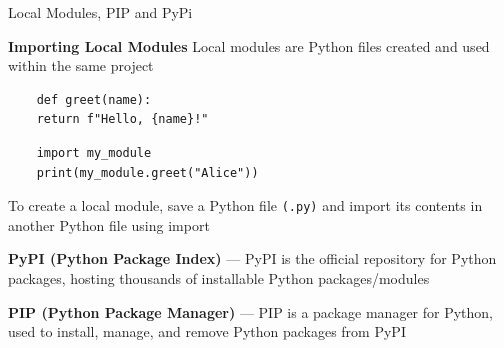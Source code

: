\documentclass[
	11pt, 
]{beamer}
\begin{document}


\begin{frame}[fragile]{Local Modules, PIP and PyPi}

\begin{block}{\textbf{Importing Local Modules}}
Local modules are Python files created and used within the same project

\begin{verbatim}
    def greet(name):
    return f"Hello, {name}!"
\end{verbatim}

\begin{verbatim}
    import my_module
    print(my_module.greet("Alice"))
\end{verbatim}

To create a local module, save a Python file \texttt{(.py)} and import its contents in another Python file using import
\end{block}

\vspace{.2cm}

\textbf{PyPI (Python Package Index)} --- PyPI is the official repository for Python packages, hosting thousands of installable Python packages/modules

\vspace{.2cm}

\textbf{PIP (Python Package Manager)} --- PIP is a package manager for Python, used to install, manage, and remove Python packages from PyPI

\end{frame}

\end{document}
